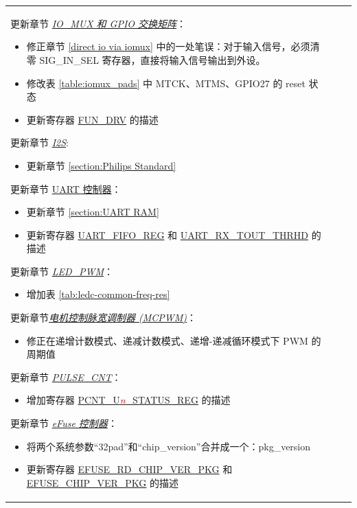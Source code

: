 \begin{longtable}[l]{ | m{2cm} | m{1.5cm} | m{12cm} | }
更新章节 \hyperref[mod:iomuxgpio]{\it{IO\_MUX 和 GPIO 交换矩阵}}：
\begin{itemize}
\item 修正章节 \ref{direct io via iomux} 中的一处笔误：对于输入信号，必须清零 SIG\_IN\_SEL 寄存器，直接将输入信号输出到外设。
\item 修改表 \ref{table:iomux_pads} 中 MTCK、MTMS、GPIO27 的 reset 状态
\item 更新寄存器 \hyperref[FUNDRV]{FUN\_DRV} 的描述
\end{itemize}

更新章节 \hyperref[mod:i2s]{\it{I2S}}:
\begin{itemize}
\item 更新章节 \ref{section:Philips Standard}
\end{itemize}

更新章节 \hyperref[mod:uart]{UART 控制器}：
\begin{itemize}
\item 更新章节 \ref{section:UART RAM}
\item 更新寄存器 \hyperref[regdesc:UARTFIFOREG]{UART\_FIFO\_REG} 和 \hyperref[UARTRXTOUTTHRHD]{UART\_RX\_TOUT\_THRHD} 的描述
\end{itemize}

更新章节 \hyperref[mod:ledpwm]{\it{LED\_PWM}}：
\begin{itemize}
\item 增加表 \ref{tab:ledc-common-freq-res}
\end{itemize}

更新章节\hyperref[mod:mcpwm]{\it{电机控制脉宽调制器 (MCPWM)}}：
\begin{itemize}
\item 修正在递增计数模式、递减计数模式、递增-递减循环模式下 PWM 的周期值
\end{itemize}

更新章节 \hyperref[mod:pcnt]{\it{PULSE\_CNT}}：
\begin{itemize}
\item 增加寄存器 \hyperref[regdesc:PCNTUnSTATUSREG]{PCNT\_U\textcolor{red}{\it{n}}\_STATUS\_REG} 的描述
\end{itemize}

更新章节 \hyperref[mod:efuse]{\it{eFuse 控制器}}：
\begin{itemize}
\item 将两个系统参数“32pad”和“chip\_version”合并成一个：pkg\_version
\item 更新寄存器 \hyperref[regdesc:EFUSERDCHIPVERPKG]{EFUSE\_RD\_CHIP\_VER\_PKG} 和 \hyperref[regdesc:EFUSECHIPVERPKG]{EFUSE\_CHIP\_VER\_PKG} 的描述
\end{itemize}


\end{longtable}
